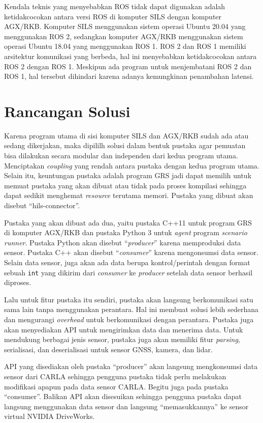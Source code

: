 Kendala teknis yang menyebabkan ROS tidak dapat digunakan adalah ketidakcocokan
antara versi ROS di komputer SILS dengan komputer AGX/RKB. Komputer SILS
menggunakan sistem operasi Ubuntu 20.04 yang menggunakan ROS 2, sedangkan
komputer AGX/RKB menggunakan sistem operasi Ubuntu 18.04 yang menggunakan ROS 1.
ROS 2 dan ROS 1 memiliki arsitektur komunikasi yang berbeda, hal ini menyebabkan
ketidakcocokan antara ROS 2 dengan ROS 1. Meskipun ada program untuk
menjembatani ROS 2 dan ROS 1, hal tersebut dihindari karena adanya kemungkinan
penambahan latensi.

\section{Rancangan Solusi}

Karena program utama di sisi komputer SILS dan AGX/RKB sudah ada atau sedang
dikerjakan, maka dipililh solusi dalam bentuk pustaka agar pemuatan bisa
dilakukan secara modular dan independen dari kedua program utama. Menciptakan
\textit{coupling} yang rendah antara pustaka dengan kedua program utama. Selain
itu, keuntungan pustaka adalah program GRS jadi dapat memilih untuk memuat
pustaka yang akan dibuat atau tidak pada proses kompilasi sehingga dapat sedikit
menghemat \textit{resource} terutama memori. Pustaka yang dibuat akan disebut
``hils-connector''.

Pustaka yang akan dibuat ada dua, yaitu pustaka C++11 untuk program GRS di
komputer AGX/RKB dan pustaka Python 3 untuk \textit{agent} program
\textit{scenario runner}. Pustaka Python akan disebut ``\textit{producer}''
karena memproduksi data sensor. Pustaka C++ akan disebut ``\textit{consumer}''
karena mengonsumsi data sensor. Selain data sensor, juga akan ada data berupa
kontrol/perintah dengan format sebuah \texttt{int} yang dikirim dari
\textit{consumer} ke \textit{producer} setelah data sensor berhasil diproses.

Lalu untuk fitur pustaka itu sendiri, pustaka akan langsung berkomunikasi satu
sama lain tanpa menggunakan perantara. Hal ini membuat solusi lebih sederhana
dan mengurangi \textit{overhead} untuk berkomunikasi dengan perantara. Pustaka
juga akan menyediakan API untuk mengirimkan data dan menerima data. Untuk
mendukung berbagai jenis sensor, pustaka juga akan memiliki fitur
\textit{parsing}, serialisasi, dan deserialisasi untuk sensor GNSS, kamera, dan
lidar.

API yang disediakan oleh pustaka ``producer'' akan langsung mengkonsumsi data
sensor dari CARLA sehingga pengguna pustaka tidak perlu melakukan modifikasi
apapun pada data sensor CARLA. Begitu juga pada pustaka ``consumer''. Balikan
API akan disesuikan sehingga pengguna pustaka dapat langsung menggunakan data
sensor dan langsung ``memasukkannya'' ke sensor virtual NVIDIA DriveWorks.

